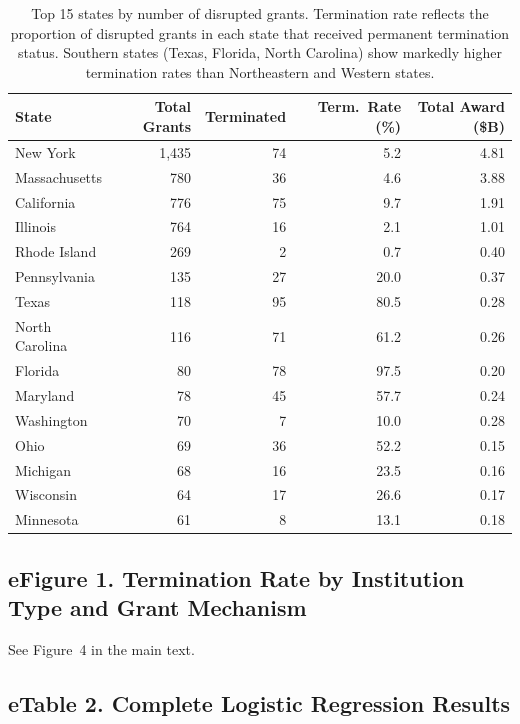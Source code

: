 \documentclass[10pt, letterpaper]{article}
\begin{document}
\begin{table}[H]
\centering
\sffamily\fontsize{8.5}{11}\selectfont
\begin{tabular}{lrrrr}
\toprule
\textbf{State} & \textbf{Total Grants} & \textbf{Terminated} & \textbf{Term.\ Rate (\%)} & \textbf{Total Award (\$B)} \\
\midrule
New York       & 1,435 & 74  & 5.2  & 4.81 \\
Massachusetts  & 780   & 36  & 4.6  & 3.88 \\
California     & 776   & 75  & 9.7  & 1.91 \\
Illinois       & 764   & 16  & 2.1  & 1.01 \\
Rhode Island   & 269   & 2   & 0.7  & 0.40 \\
Pennsylvania   & 135   & 27  & 20.0 & 0.37 \\
Texas          & 118   & 95  & 80.5 & 0.28 \\
North Carolina & 116   & 71  & 61.2 & 0.26 \\
Florida        & 80    & 78  & 97.5 & 0.20 \\
Maryland       & 78    & 45  & 57.7 & 0.24 \\
Washington     & 70    & 7   & 10.0 & 0.28 \\
Ohio           & 69    & 36  & 52.2 & 0.15 \\
Michigan       & 68    & 16  & 23.5 & 0.16 \\
Wisconsin      & 64    & 17  & 26.6 & 0.17 \\
Minnesota      & 61    & 8   & 13.1 & 0.18 \\
\bottomrule
\end{tabular}
\caption{Top 15 states by number of disrupted grants. Termination rate reflects the proportion of disrupted grants in each state that received permanent termination status. Southern states (Texas, Florida, North Carolina) show markedly higher termination rates than Northeastern and Western states.}
\end{table}

\subsection*{eFigure 1. Termination Rate by Institution Type and Grant Mechanism}

See Figure~4 in the main text.

\subsection*{eTable 2. Complete Logistic Regression Results}
\end{document}
